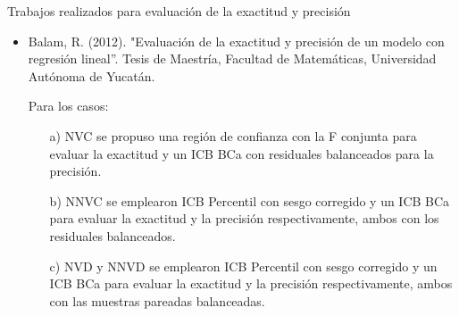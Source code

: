 \documentclass[serif, aspectratio=169]{beamer}
\begin{document}
\begin{frame}{Trabajos realizados para evaluación de la exactitud y precisión}
	
	\begin{itemize}
		
				
		\item Balam, R. (2012). "Evaluación de la exactitud y precisión de un modelo con regresión lineal”. Tesis de Maestría, Facultad de Matemáticas, Universidad Autónoma de Yucatán.
		\vspace{0.3cm}
		
		 Para los casos: 
	\begin{itemize}
		\item[a)]	NVC se propuso una región de confianza con la F conjunta para evaluar la exactitud y un ICB BCa con residuales balanceados para la precisión.
		\vspace{.2cm}
	
		\item[b)] 		NNVC se emplearon ICB Percentil con sesgo corregido y un ICB BCa para evaluar la exactitud y la precisión respectivamente, ambos con los residuales balanceados.
		\vspace{.2cm}
		
		\item[c)] 		NVD y NNVD se emplearon ICB Percentil con sesgo corregido y un ICB BCa para evaluar la exactitud y la precisión respectivamente, ambos con las muestras pareadas balanceadas.
	\end{itemize}
		

	\end{itemize}
	
\end{frame}
\end{document}
